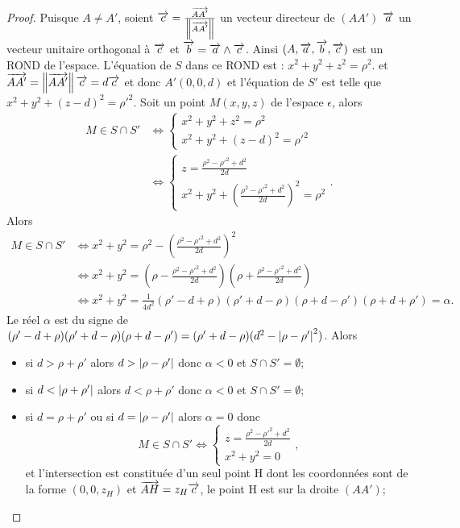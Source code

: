 \begin{proof}
  Puisque \(A\neq A'\), soient \(\overrightarrow{c}=\frac{\overrightarrow{AA'}}{\left\lVert\overrightarrow{AA'}\right\rVert}\) un vecteur directeur de \((AA')\) \(\overrightarrow{a}\) un vecteur unitaire orthogonal à \(\overrightarrow{c}\) et \(\overrightarrow{b}=\overrightarrow{a}\wedge\overrightarrow{c}\). Ainsi \((A,\overrightarrow{a},\overrightarrow{b},\overrightarrow{c})\) est un ROND de l'espace. L'équation de \(S\) dans ce ROND est : \(x^2+y^2+z^2=\rho^2\). et \(\overrightarrow{AA'}=\left\lVert\overrightarrow{AA'}\right\rVert\overrightarrow{c}=d\overrightarrow{c}\) et donc \(A'(0,0,d)\) et l'équation de \(S'\) est telle que \(x^2+y^2+(z-d)^2=\rho'^2\). Soit un point \(M(x,y,z)\) de l'espace \(\epsilon\), alors
  \begin{align}
    M \in S\cap S' &\iff \begin{cases} x^2+y^2+z^2=\rho^2 \\ x^2+y^2+(z-d)^2=\rho'^2 \end{cases} \\
    &\iff \begin{cases} z = \frac{\rho^2-\rho'^2+d^2}{2d}\\ x^2+y^2+\left(\frac{\rho^2-\rho'^2+d^2}{2d}\right)^2=\rho^2 \end{cases}.
  \end{align}
  Alors
  \begin{align} 
    M \in S\cap S' &\iff x^2+y^2=\rho^2-\left(\frac{\rho^2-\rho'^2+d^2}{2d}\right)^2\\
    &\iff x^2+y^2=\left(\rho-\frac{\rho^2-\rho'^2+d^2}{2d}\right)\left(\rho+\frac{\rho^2-\rho'^2+d^2}{2d}\right)\\
    &\iff x^2+y^2=\frac{1}{4d^2}(\rho'-d+\rho)(\rho'+d-\rho)(\rho+d-\rho')(\rho+d+\rho')=\alpha.
  \end{align}
  Le réel \(\alpha\) est du signe de \((\rho'-d+\rho)(\rho'+d-\rho)(\rho+d-\rho')=(\rho'+d-\rho)(d^2-\left\lvert\rho-\rho'\right\rvert^2)\). Alors
  \begin{itemize}
  \item si \(d>\rho+\rho'\) alors \(d>\left\lvert\rho-\rho'\right\rvert\) donc \(\alpha<0\) et \(S\cap S'=\emptyset\);
  \item si \(d<\left\lvert\rho+\rho'\right\rvert\) alors \(d<\rho+\rho'\) donc \(\alpha<0\) et \(S\cap S'=\emptyset\);
  \item si \(d=\rho+\rho'\) ou si \(d=\left\lvert\rho-\rho'\right\rvert\) alors \(\alpha=0\) donc
    \begin{equation}
      M\in S\cap S' \iff \begin{cases} z=\frac{\rho^2-\rho'^2+d^2}{2d} \\x^2+y^2=0\end{cases},
    \end{equation}
    et l'intersection est constituée d'un seul point H dont les coordonnées sont de la forme \((0,0,z_H)\) et \(\overrightarrow{AH}=z_H \overrightarrow{c}\), le point H est sur la droite \((AA')\);

\end{itemize}
\end{proof}

